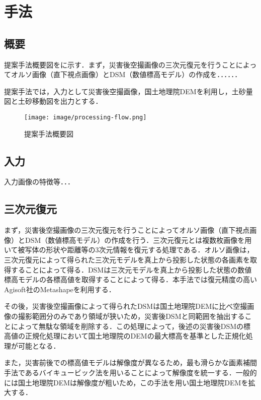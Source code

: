 \chapter{手法}
  \section{概要}
    提案手法概要図をに示す．まず，災害後空撮画像の三次元復元を行うことによってオルソ画像（直下視点画像）とDSM（数値標高モデル）の作成を．．．．．．

    提案手法では，入力として災害後空撮画像，国土地理院DEMを利用し，土砂量図と土砂移動図を出力とする．


    \begin{figure}[t]
      \centering
      \texttt{[image: image/processing-flow.png]}
      \caption{提案手法概要図}
      \label{img2-1}
    \end{figure}


  \section{入力}
    入力画像の特徴等．．．



  \section{三次元復元}
    まず，災害後空撮画像の三次元復元を行うことによってオルソ画像（直下視点画像）とDSM（数値標高モデル）の作成を行う．三次元復元とは複数枚画像を用いて被写体の形状や距離等の3次元情報を復元する処理である．オルソ画像は，三次元復元によって得られた三次元モデルを真上から投影した状態の各画素を取得することによって得る．DSMは三次元モデルを真上から投影した状態の数値標高モデルの各標高値を取得することによって得る．本手法では復元精度の高いAgisoft社のMetashape\cite{使用手法1}を利用する．

    その後，災害後空撮画像によって得られたDSMは国土地理院DEMに比べ空撮画像の撮影範囲分のみであり領域が狭いため，災害後DSMと同範囲を抽出することによって無駄な領域を削除する．この処理によって，後述の災害後DSMの標高値の正規化処理において国土地理院のDEMの最大標高を基準とした正規化処理が可能となる．
  
    また，災害前後での標高値モデルは解像度が異なるため，最も滑らかな画素補間手法であるバイキュービック法\cite{論文手法1}を用いることによって解像度を統一する．一般的には国土地理院DEMは解像度が粗いため，この手法を用い国土地理院DEMを拡大する．
    
